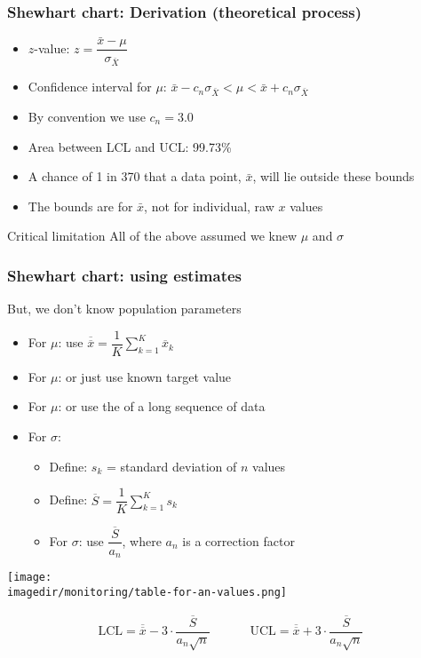 \begin{frame}\frametitle{Shewhart chart: Derivation (theoretical process)}
	\begin{itemize}
		\item	$z$-value: $z = \dfrac{\bar{x} - \mu}{\sigma_{\bar{X}}}$
	\end{itemize}
	\begin{itemize}
		\item	Confidence interval for $\mu$: $\bar{x} - c_n\sigma_{\bar{X}} < \mu < \bar{x} + c_n\sigma_{\bar{X}}$
	\end{itemize}
	\begin{itemize}
		\item	By convention we use $c_n = 3.0$
		\item	Area between LCL and UCL: 99.73\%
		\item	A chance of 1 in 370 that a data point, $\bar{x}$, will lie outside these bounds
		\item	The bounds are for $\bar{x}$, not for individual, raw $x$ values
	\end{itemize}
	\begin{exampleblock}{Critical limitation}
		All of the above assumed we knew $\mu$ and $\sigma$
	\end{exampleblock}

	
\end{frame}

\begin{frame}\frametitle{Shewhart chart: using estimates}

	But, we don't know population parameters
	\begin{itemize}
		\item	For $\mu$: use $\overline{\overline{x}} = \dfrac{1}{K} \displaystyle \sum_{k=1}^{K}{ \overline{x}_k}$
		\item	For $\mu$: or just use known target value
		\item	For $\mu$: or use the {} of a long sequence of data
		\item	For $\sigma$:
		\begin{itemize}
			\item	Define: $s_k$ = standard deviation of $n$ values
			\item	Define: $\overline{S} = \dfrac{1}{K} \displaystyle \sum_{k=1}^{K}{s_k}$
			\item	For $\sigma$: use $\dfrac{\overline{S}}{a_n}$, where $a_n$ is a correction factor
		\end{itemize}
	\end{itemize}

	\begin{center}
		\texttt{[image: \\imagedir/monitoring/table-for-an-values.png]}
	\end{center}
	
	$$
	\begin{array}{rcccl}
		\text{LCL} = \overline{\overline{x}} - 3 \cdot \dfrac{\overline{S}}{a_n\sqrt{n}} && && \text{UCL} = \overline{\overline{x}} + 3 \cdot \dfrac{\overline{S}}{a_n\sqrt{n}}
	\end{array}
	$$
\end{frame}

